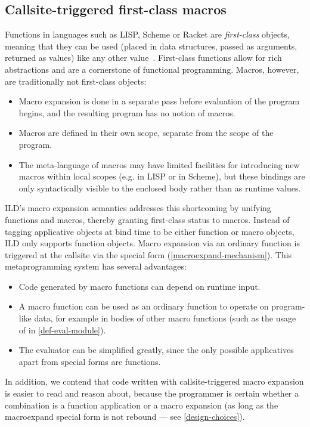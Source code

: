 \subsection{Callsite-triggered first-class macros}
\label{macro-function-duality}
Functions in languages such as LISP, Scheme or Racket are \emph{first-class}
objects, meaning that they can be used (placed in data structures, passed as arguments,
returned as values) like any other value~\cite{kohlbecker1986syntactic,r5rs,racket}.
First-class functions allow for rich abstractions
and are a cornerstone of functional programming. Macros, however,
are traditionally not first-class objects:
\begin{itemize}
\item Macro expansion is done in a separate pass before evaluation of the
program begins, and the resulting program has no notion of macros.
\item Macros are defined in their own scope, separate from the scope
of the program.
\item The meta-language of macros may have limited facilities for
introducing new macros within local scopes (e.g.  in LISP or
 in Scheme), but these bindings are only syntactically visible
to the enclosed body rather than as runtime values.
\end{itemize}
ILD's macro expansion semantics addresses this shortcoming by unifying functions
and macros, thereby granting first-class status to macros.
Instead of tagging applicative objects at bind time to be either
function or macro objects, ILD only supports function objects. Macro expansion via an
ordinary function is triggered at the callsite via the 
special form (\cref{macroexpand-mechanism}).
This metaprogramming system has several advantages:
\begin{itemize}
\item Code generated by macro functions can depend on runtime input.
\item A macro function can be used as an ordinary function to operate on
program-like data, for example in bodies of other macro functions (such as
the usage of  in \cref{def-eval-module}).
\item The evaluator can be simplified greatly, since the only possible applicatives apart
from special forms are functions.
\end{itemize}
In addition, we contend that code written with callsite-trig\-gered %
macro expansion is easier to read and reason about, because the programmer
is certain whether a combination is a function application or a macro expansion
(as long as the macroexpand special form is not rebound --- see \cref{design-choices}).


